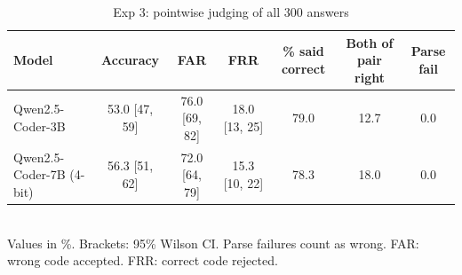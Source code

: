 \begin{table}[t]
\centering
\caption{Exp 3: pointwise judging of all 300 answers}
\label{tab:t2_pointwise}
\footnotesize
\setlength{\tabcolsep}{3pt}
\begin{tabular}{lcccccc}
\hline
Model & Accuracy & FAR & FRR & \% said correct & Both of pair right & Parse fail \\
\hline
Qwen2.5-Coder-3B & 53.0 [47, 59] & 76.0 [69, 82] & 18.0 [13, 25] & 79.0 & 12.7 & 0.0 \\
Qwen2.5-Coder-7B (4-bit) & 56.3 [51, 62] & 72.0 [64, 79] & 15.3 [10, 22] & 78.3 & 18.0 & 0.0 \\
\hline
\end{tabular}
\\[2pt]
{\scriptsize Values in \%. Brackets: 95\% Wilson CI. Parse failures count as wrong. FAR: wrong code accepted. FRR: correct code rejected.}
\end{table}
